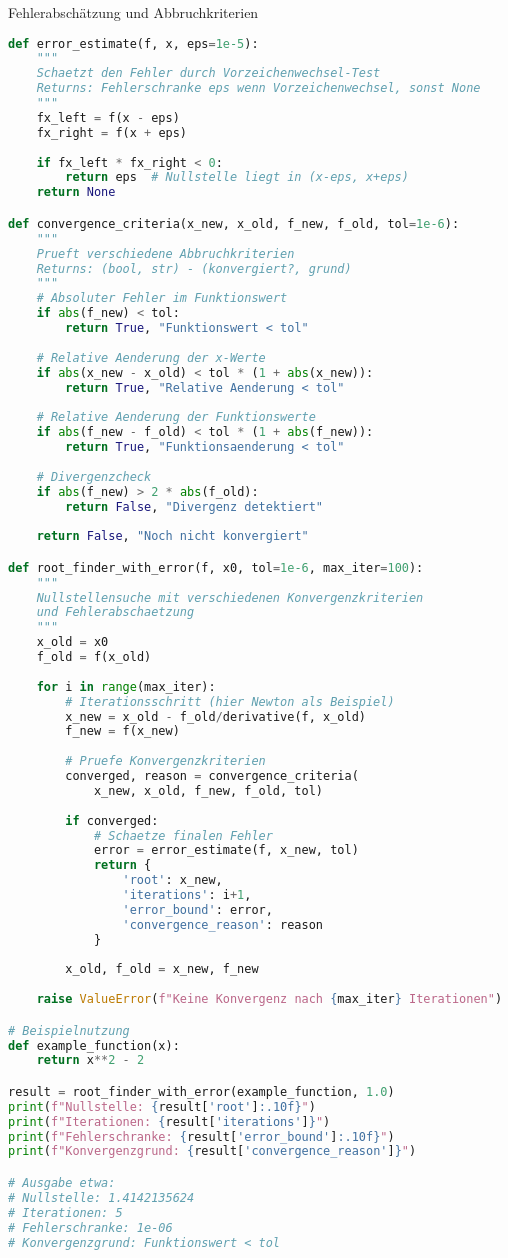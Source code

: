 \begin{examplecode}{Fehlerabschätzung und Abbruchkriterien}
\begin{lstlisting}[language=Python, style=basesmol]
def error_estimate(f, x, eps=1e-5):
    """
    Schaetzt den Fehler durch Vorzeichenwechsel-Test
    Returns: Fehlerschranke eps wenn Vorzeichenwechsel, sonst None
    """
    fx_left = f(x - eps)
    fx_right = f(x + eps)
    
    if fx_left * fx_right < 0:
        return eps  # Nullstelle liegt in (x-eps, x+eps)
    return None

def convergence_criteria(x_new, x_old, f_new, f_old, tol=1e-6):
    """
    Prueft verschiedene Abbruchkriterien
    Returns: (bool, str) - (konvergiert?, grund)
    """
    # Absoluter Fehler im Funktionswert
    if abs(f_new) < tol:
        return True, "Funktionswert < tol"
        
    # Relative Aenderung der x-Werte
    if abs(x_new - x_old) < tol * (1 + abs(x_new)):
        return True, "Relative Aenderung < tol"
        
    # Relative Aenderung der Funktionswerte
    if abs(f_new - f_old) < tol * (1 + abs(f_new)):
        return True, "Funktionsaenderung < tol"
        
    # Divergenzcheck
    if abs(f_new) > 2 * abs(f_old):
        return False, "Divergenz detektiert"
        
    return False, "Noch nicht konvergiert"

def root_finder_with_error(f, x0, tol=1e-6, max_iter=100):
    """
    Nullstellensuche mit verschiedenen Konvergenzkriterien
    und Fehlerabschaetzung
    """
    x_old = x0
    f_old = f(x_old)
    
    for i in range(max_iter):
        # Iterationsschritt (hier Newton als Beispiel)
        x_new = x_old - f_old/derivative(f, x_old)
        f_new = f(x_new)
        
        # Pruefe Konvergenzkriterien
        converged, reason = convergence_criteria(
            x_new, x_old, f_new, f_old, tol)
            
        if converged:
            # Schaetze finalen Fehler
            error = error_estimate(f, x_new, tol)
            return {
                'root': x_new,
                'iterations': i+1,
                'error_bound': error,
                'convergence_reason': reason
            }
            
        x_old, f_old = x_new, f_new
        
    raise ValueError(f"Keine Konvergenz nach {max_iter} Iterationen")

# Beispielnutzung
def example_function(x):
    return x**2 - 2

result = root_finder_with_error(example_function, 1.0)
print(f"Nullstelle: {result['root']:.10f}")
print(f"Iterationen: {result['iterations']}")
print(f"Fehlerschranke: {result['error_bound']:.10f}")
print(f"Konvergenzgrund: {result['convergence_reason']}")

# Ausgabe etwa:
# Nullstelle: 1.4142135624
# Iterationen: 5
# Fehlerschranke: 1e-06
# Konvergenzgrund: Funktionswert < tol
\end{lstlisting}
\end{examplecode}